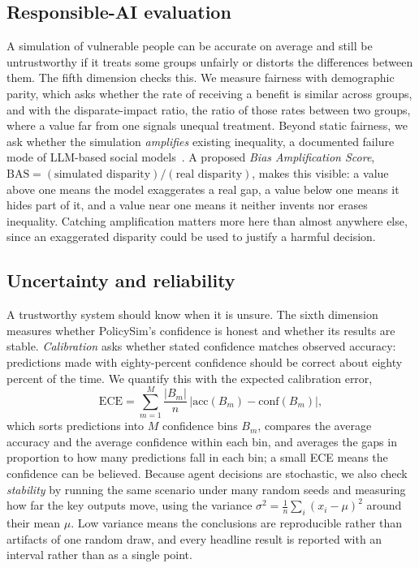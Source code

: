 \documentclass[conference]{IEEEtran}
\begin{document}
\subsection{Responsible-AI evaluation}
A simulation of vulnerable people can be accurate on average and still be untrustworthy if it treats some groups unfairly or distorts the differences between them. The fifth dimension checks this. We measure fairness with demographic parity, which asks whether the rate of receiving a benefit is similar across groups, and with the disparate-impact ratio, the ratio of those rates between two groups, where a value far from one signals unequal treatment. Beyond static fairness, we ask whether the simulation \emph{amplifies} existing inequality, a documented failure mode of LLM-based social models~\cite{bisbee2024,santurkar2023}. A proposed \emph{Bias Amplification Score}, $\mathrm{BAS} = (\text{simulated disparity})/(\text{real disparity})$, makes this visible: a value above one means the model exaggerates a real gap, a value below one means it hides part of it, and a value near one means it neither invents nor erases inequality. Catching amplification matters more here than almost anywhere else, since an exaggerated disparity could be used to justify a harmful decision.

\subsection{Uncertainty and reliability}
A trustworthy system should know when it is unsure. The sixth dimension measures whether PolicySim's confidence is honest and whether its results are stable. \emph{Calibration} asks whether stated confidence matches observed accuracy: predictions made with eighty-percent confidence should be correct about eighty percent of the time. We quantify this with the expected calibration error,
\begin{equation}
\mathrm{ECE} = \sum_{m=1}^{M} \frac{\lvert B_m\rvert}{n}\,\bigl\lvert \mathrm{acc}(B_m) - \mathrm{conf}(B_m)\bigr\rvert,
\end{equation}
which sorts predictions into $M$ confidence bins $B_m$, compares the average accuracy and the average confidence within each bin, and averages the gaps in proportion to how many predictions fall in each bin; a small ECE means the confidence can be believed. Because agent decisions are stochastic, we also check \emph{stability} by running the same scenario under many random seeds and measuring how far the key outputs move, using the variance $\sigma^2 = \tfrac{1}{n}\sum_i (x_i - \mu)^2$ around their mean $\mu$. Low variance means the conclusions are reproducible rather than artifacts of one random draw, and every headline result is reported with an interval rather than as a single point.
\end{document}
